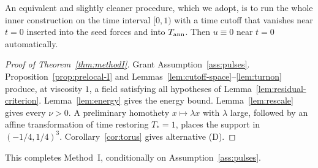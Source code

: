An equivalent and slightly cleaner procedure, which we adopt, is to run the whole inner construction on the time interval $[0,1)$ with a time cutoff that vanishes near $t=0$ inserted into the seed forces and into $T_{\mathrm{ann}}$. Then $u\equiv 0$ near $t=0$ automatically.

\begin{proof}[Proof of Theorem~\ref{thm:methodI}]
Grant Assumption~\ref{ass:pulses}. Proposition~\ref{prop:prelocal-I} and Lemmas~\ref{lem:cutoff-space}--\ref{lem:turnon} produce, at viscosity $1$, a field satisfying all hypotheses of Lemma~\ref{lem:residual-criterion}. Lemma~\ref{lem:energy} gives the energy bound. Lemma~\ref{lem:rescale} gives every $\nu>0$. A preliminary homothety $x\mapsto \lambda x$ with $\lambda$ large, followed by an affine transformation of time restoring $T_*=1$, places the support in $(-1/4,1/4)^3$. Corollary~\ref{cor:torus} gives alternative (D).
\end{proof}

This completes Method~I, conditionally on Assumption~\ref{ass:pulses}.
